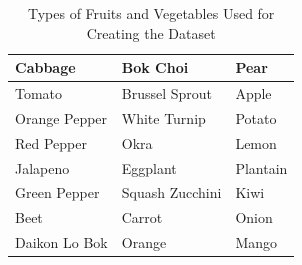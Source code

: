 \bgroup
\def\arraystretch{1.5}
\begin{table}[htbp]
	\caption{Types of Fruits and Vegetables Used for Creating the Dataset}
	\begin{center}
		\begin{tabular}{| >{\centering\arraybackslash}m{2cm} | >{\centering\arraybackslash}m{2cm} | >{\centering\arraybackslash}m{2cm} |}
			\hline
			Cabbage & Bok Choi & Pear \\
			\hline
			Tomato & Brussel Sprout & Apple \\
			\hline
			Orange Pepper & White Turnip & Potato \\
			\hline
			Red Pepper & Okra & Lemon \\
			\hline
			Jalapeno & Eggplant & Plantain \\
			\hline
			Green Pepper & Squash Zucchini & Kiwi \\
			\hline
			Beet & Carrot & Onion \\
			\hline
			Daikon Lo Bok & Orange & Mango \\
			\hline
		\end{tabular}
		\label{tab:veg_types}
	\end{center}
\end{table}
\egroup